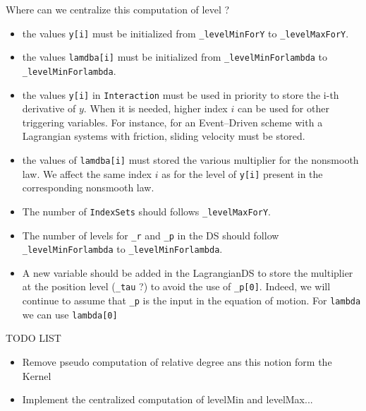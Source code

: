 \begin{ndrva}
  Where can we centralize this computation of level ?
\end{ndrva}

\begin{itemize}
\item the values {\tt y[i]} must be initialized from {\tt \_levelMinForY} to {\tt \_levelMaxForY}.
\item the values {\tt lamdba[i]} must be initialized from {\tt \_levelMinForlambda} to  {\tt \_levelMinForlambda}.
\item the values {\tt y[i]} in {\tt Interaction} must be used in priority to store the i-th derivative of $y$. When it is needed, higher index $i$ can be used for other triggering variables. For instance, for an Event--Driven scheme with a Lagrangian systems with friction, sliding velocity must be stored.
\item the values of {\tt lamdba[i]} must stored the various multiplier for the nonsmooth law. We affect the same index $i$ as for the level of {\tt y[i]} present in the corresponding nonsmooth law.
\item The number of {\tt IndexSets} should follows {\tt \_levelMaxForY}.
\item The number of levels for {\tt \_r} and {\tt \_p} in the DS should follow {\tt \_levelMinForlambda} to  {\tt \_levelMinForlambda}.
\item A new variable should be added in the LagrangianDS to store the multiplier at the position level ({\tt \_tau} ?) to avoid the use of {\tt \_p[0]}. Indeed, we will continue to assume that {\tt \_p} is the input in the equation of motion. For {\tt lambda} we can  use {\tt lambda[0]} 
\end{itemize}

TODO LIST
\begin{itemize}
\item Remove pseudo computation of relative degree ans this notion form the Kernel
\item Implement the centralized computation of levelMin and levelMax...
\end{itemize}


